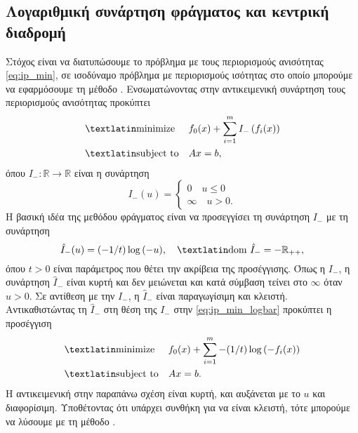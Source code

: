 \subsection{Λογαριθμική συνάρτηση φράγματος και κεντρική διαδρομή}
Στόχος είναι να διατυπώσουμε το πρόβλημα με τους περιορισμούς ανισότητας
\eqref{eq:ip_min}, σε ισοδύναμο πρόβλημα με περιορισμούς ισότητας στο οποίο
μπορούμε να εφαρμόσουμε τη μέθοδο . Ενσωματώνοντας στην
αντικειμενική συνάρτηση  τους περιορισμούς ανισότητας προκύπτει
\begin{equation}\label{eq:ip_min_logbar}
    \begin{aligned}
        & \text{\tl{minimize}}
        & & f_0(x) + \sum_{i=1}^m I_{-}\left(f_i(x)\right)\\
        & \text{\tl{subject to}}
        & & Ax = b,
    \end{aligned}
\end{equation}
όπου \( I_{-}: \mathbb{R} \to \mathbb{R} \) είναι η συνάρτηση
\begin{equation*}
    I_{-}(u) =
    \begin{cases}
        0 \quad u \leq 0 \\
        \infty \quad u > 0.
    \end{cases}
\end{equation*}
Η βασική ιδέα της μεθόδου φράγματος είναι να προσεγγίσει τη συνάρτηση
\( I_{-} \) με τη συνάρτηση
\begin{equation*}
    \hat{I}_{-}(u) = (-1/t)\log{(-u)}, \quad \text{\tl{dom}}\ \hat{I}_{-} =
    -\mathbb{R}_{++},
\end{equation*}
όπου \( t > 0 \) είναι παράμετρος που θέτει την ακρίβεια της προσέγγισης. Όπως
η \( I_{-} \), η συνάρτηση \( \hat{I}_{-} \) είναι κυρτή και δεν μειώνεται και
κατά σύμβαση τείνει στο \( \infty \) όταν \( u > 0 \). Σε αντίθεση με την \(
I_{-} \), η \( \hat{I}_{-} \) είναι παραγωγίσιμη και κλειστή. Αντικαθιστώντας τη
\( \hat{I}_{-} \) στη θέση της \( I_{-} \) στην \eqref{eq:ip_min_logbar}
προκύπτει η προσέγγιση
\begin{equation}\label{eq:ip_min_logappr}
    \begin{aligned}
        & \text{\tl{minimize}}
        & & f_0(x) + \sum_{i=1}^m -(1/t)\log{(-f_i(x))} \\
        & \text{\tl{subject to}}
        & & Ax = b.
    \end{aligned}
\end{equation}
Η αντικειμενική στην παραπάνω σχέση είναι κυρτή, και αυξάνεται με το
\( u \) και διαφορίσιμη. Υποθέτοντας ότι υπάρχει συνθήκη για να είναι κλειστή,
τότε μπορούμε να λύσουμε με τη μέθοδο .

